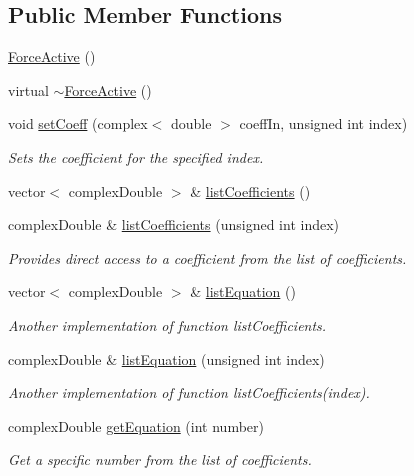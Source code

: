 \subsection*{Public Member Functions}
\begin{DoxyCompactItemize}
\item 
\hyperlink{class_force_active_ae006e3394f8c925c6a3218686c5cc8ae}{Force\-Active} ()
\item 
virtual \hyperlink{class_force_active_aa2db4bc1fb74ecb6e0ee46c59a40dd2a}{$\sim$\-Force\-Active} ()
\item 
void \hyperlink{class_force_active_a1775530282b1d473cd95afd7f01619bb}{set\-Coeff} (complex$<$ double $>$ coeff\-In, unsigned int index)
\begin{DoxyCompactList}\small\item\em Sets the coefficient for the specified index. \end{DoxyCompactList}\item 
vector$<$ complex\-Double $>$ \& \hyperlink{class_force_active_a752a48e1f4dfc483a1cdb18754f8e630}{list\-Coefficients} ()
\item 
complex\-Double \& \hyperlink{class_force_active_af96d4a0a2f0aa28911d8798f62d3b8bd}{list\-Coefficients} (unsigned int index)
\begin{DoxyCompactList}\small\item\em Provides direct access to a coefficient from the list of coefficients. \end{DoxyCompactList}\item 
vector$<$ complex\-Double $>$ \& \hyperlink{class_force_active_a931628f3a5c5d9b142726697a96e1407}{list\-Equation} ()
\begin{DoxyCompactList}\small\item\em Another implementation of function list\-Coefficients. \end{DoxyCompactList}\item 
complex\-Double \& \hyperlink{class_force_active_a573a98979938dd6bfbaf5d40ae17a058}{list\-Equation} (unsigned int index)
\begin{DoxyCompactList}\small\item\em Another implementation of function list\-Coefficients(index). \end{DoxyCompactList}\item 
complex\-Double \hyperlink{class_force_active_a2e01f54c3071d2f8831fb7763cf14500}{get\-Equation} (int number)
\begin{DoxyCompactList}\small\item\em Get a specific number from the list of coefficients. \end{DoxyCompactList}\end{DoxyCompactItemize}
